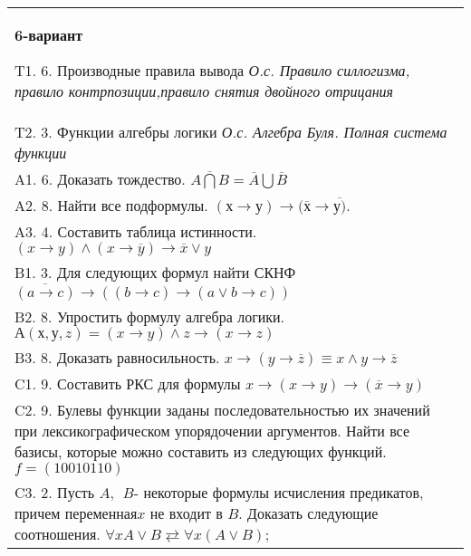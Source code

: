 \documentclass{article}
\begin{document}
\begin{tabular}{m{17cm}}
\textbf{6-вариант}
\newline

T1. 6. Производные правила вывода \emph{О.с. Правило силлогизма, правило контрпозиции,правило снятия двойного отрицания} \\
T2. 3. Функции алгебры логики \emph{О.с. Алгебра Буля. Полная система функции} \\
A1. 6. Доказать тождество. \(\overline{A\bigcap B} = \overline{A}\bigcup\overline{B}\) \\
A2. 8. Найти все подформулы. \((х \rightarrow у) \rightarrow (\overline{х} \rightarrow \overline{у)}\). \\
A3. 4. Составить таблица истинности. \((x \rightarrow y) \land (x \rightarrow \overline{y}) \rightarrow \overline{x} \vee y\) \\
B1. 3. Для следующих формул найти СКНФ \(\overline{(a \rightarrow c)} \rightarrow \left( (b \rightarrow c) \rightarrow (a \vee b \rightarrow c) \right)\) \\
B2. 8. Упростить формулу алгебра логики. \(А(х,у,z) = (x \rightarrow y) \land z \rightarrow (x \rightarrow z)\) \\
B3. 8. Доказать равносильность. \(x \rightarrow \left( y \rightarrow \overline{z} \right) \equiv x \land y \rightarrow \overline{z}\) \\
C1. 9. Составить РКС для формулы \(x \rightarrow (x \rightarrow y) \rightarrow (\overline{x} \rightarrow y)\ \) \\
C2. 9. Булевы функции заданы последовательностью их значений при лексикографическом упорядочении аргументов. Найти все базисы, которые можно составить из следующих функций. \(f = (10010110)\) \\
C3. 2. Пусть \(A,\ \ B\)- некоторые формулы исчисления предикатов, причем переменная\(x\) не входит в \(B\). Доказать следующие соотношения. \(\forall xA \vee B \rightleftarrows \forall x(A \vee B)\); \\

\end{tabular}
\vspace{1cm}
\end{document}
